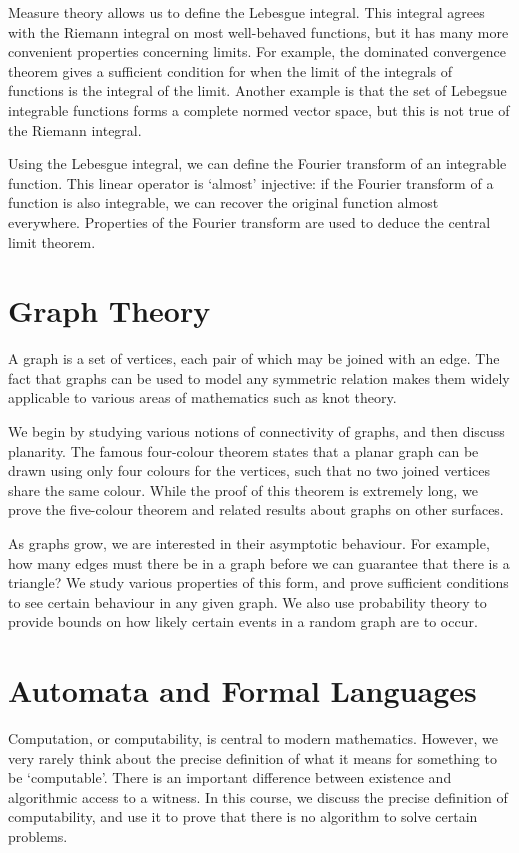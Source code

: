 Measure theory allows us to define the Lebesgue integral.
This integral agrees with the Riemann integral on most well-behaved functions, but it has many more convenient properties concerning limits.
For example, the dominated convergence theorem gives a sufficient condition for when the limit of the integrals of functions is the integral of the limit.
Another example is that the set of Lebegsue integrable functions forms a complete normed vector space, but this is not true of the Riemann integral.

Using the Lebesgue integral, we can define the Fourier transform of an integrable function.
This linear operator is `almost' injective: if the Fourier transform of a function is also integrable, we can recover the original function almost everywhere.
Properties of the Fourier transform are used to deduce the central limit theorem.



\chapter{Graph Theory}
A graph is a set of vertices, each pair of which may be joined with an edge.
The fact that graphs can be used to model any symmetric relation makes them widely applicable to various areas of mathematics such as knot theory.

We begin by studying various notions of connectivity of graphs, and then discuss planarity.
The famous four-colour theorem states that a planar graph can be drawn using only four colours for the vertices, such that no two joined vertices share the same colour.
While the proof of this theorem is extremely long, we prove the five-colour theorem and related results about graphs on other surfaces.

As graphs grow, we are interested in their asymptotic behaviour.
For example, how many edges must there be in a graph before we can guarantee that there is a triangle?
We study various properties of this form, and prove sufficient conditions to see certain behaviour in any given graph.
We also use probability theory to provide bounds on how likely certain events in a random graph are to occur.



\chapter{Automata and Formal Languages}
Computation, or computability, is central to modern mathematics.
However, we very rarely think about the precise definition of what it means for something to be `computable'.
There is an important difference between existence and algorithmic access to a witness.
In this course, we discuss the precise definition of computability, and use it to prove that there is no algorithm to solve certain problems.

